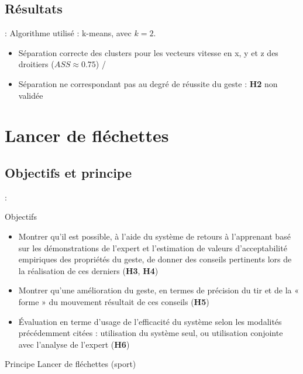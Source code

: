 \documentclass[svgnames]{beamer}
\begin{document}
	\subsection{Résultats}
	\begin{frame}{\secname : \subsecname}
	Algorithme utilisé : k-means, avec $k=2$.
	\begin{itemize}
		\item Séparation correcte des clusters pour les vecteurs vitesse en x, y et z des droitiers ($ASS \approx 0.75$) /
		\item Séparation ne correspondant pas au degré de réussite du geste : \textbf{H2} non validée
	\end{itemize}
		
	\end{frame}

	\section{Lancer de fléchettes}
	\subsection{Objectifs et principe}
	\begin{frame}{\secname : \subsecname}
		\begin{block}{Objectifs}
			\begin{itemize}[label=$\bullet$]
				\item Montrer qu'il est possible, à l'aide du système de retours à l'apprenant basé sur les démonstrations de l'expert et l'estimation de valeurs d'acceptabilité empiriques des propriétés du geste, de donner des conseils pertinents lors de la réalisation de ces derniers (\textbf{H3}, \textbf{H4})
			 	\item Montrer qu'une amélioration du geste, en termes de précision du tir et de la « forme » du mouvement résultait de ces conseils (\textbf{H5})
			 	\item Évaluation en terme d'usage de l'efficacité du système selon les modalités précédemment citées : utilisation du système seul, ou utilisation conjointe avec l'analyse de l'expert (\textbf{H6})
			 \end{itemize}
		\end{block}
	
		\begin{block}{Principe}
			Lancer de fléchettes (sport)
		\end{block}
		
	\end{frame}
	
\end{document}
